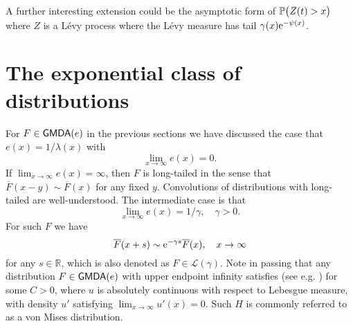 A further interesting extension could be the asymptotic form of $\mathbb{P}\bigl(Z(t)>x\bigr)$ where $Z$ is
a L\'evy process where the L\'evy measure has tail $\gamma(x)\mathrm{e}^{-\psi(x)}$.



\section{The exponential class of distributions}\label{C1C2}
For $F\in \mathsf{GMDA}(e)$ in the previous sections we have discussed the case that $e(x)=1/\lambda(x)$ with
	$$ \lim_{x\to \infty} e(x)= 0.$$
	If $\lim_{x\to \infty} e(x)=\infty$, then $F$ is long-tailed in the sense that
	$ \overline{F}(x- y) \sim \overline{F}(x)$ for any fixed $y$. Convolutions of distributions with long-tailed are well-understood. The intermediate case is that
	$$ \lim_{x\to \infty} e(x)= 1/\gamma, \quad \gamma>0.$$
	For such $F$ we have
	$$ 	\overline  F( x+ s) \sim \mathrm{e}^{-\gamma s} 	\overline  F(x), \quad x\to \infty$$
	for any $s\in \mathbb{R}$, which is also denoted as
	$F \in \mathcal{L}(\gamma)$.
	Note in passing that any distribution $F \in \mathsf{GMDA}(e)$ with upper endpoint infinity satisfies (see e.g. \cite[Prop.\,1.4]{Res})
	for some $C>0$, where $u$ is absolutely continuous with respect to Lebesgue measure, with density $u'$ satisfying  $\lim_{x\to \infty} u'(x)=0$.  Such $H$ is commonly referred to as a von Mises distribution.
	
